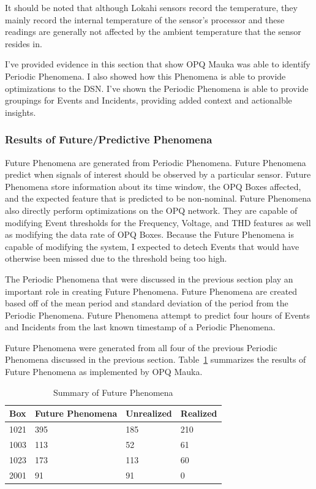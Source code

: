 It should be noted that although Lokahi sensors record the temperature, they mainly record the internal temperature of the sensor's processor and these readings are generally not affected by the ambient temperature that the sensor resides in.

I've provided evidence in this section that show OPQ Mauka was able to identify Periodic Phenomena. I also showed how this Phenomena is able to provide optimizations to the DSN. I've shown the Periodic Phenomena is able to provide groupings for Events and Incidents, providing added context and actionalble insights.

\subsubsection{Results of Future/Predictive Phenomena}

Future Phenomena are generated from Periodic Phenomena. Future Phenomena predict when signals of interest should be observed by a particular sensor. Future Phenomena store information about its time window, the OPQ Boxes affected, and the expected feature that is predicted to be non-nominal. Future Phenomena also directly perform optimizations on the OPQ network. They are capable of modifying Event thresholds for the Frequency, Voltage, and THD features as well as modifying the data rate of OPQ Boxes. Because the Future Phenomena is capable of modifying the system, I expected to detech Events that would have otherwise been missed due to the threshold being too high.

The Periodic Phenomena that were discussed in the previous section play an important role in creating Future Phenomena. Future Phenomena are created based off of the mean period and standard deviation of the period from the Periodic Phenomena. Future Phenomena attempt to predict four hours of Events and Incidents from the last known timestamp of a Periodic Phenomena.

Future Phenomena were generated from all four of the previous Periodic Phenomena discussed in the previous section. Table~\ref{table:future_summary} summarizes the results of Future Phenomena as implemented by OPQ Mauka.

\begin{table}[H]
    \centering
    \caption{Summary of Future Phenomena}
    \begin{tabularx}{\textwidth}{llll}
        \toprule
        \textbf{Box} & \textbf{Future Phenomena} &\textbf{Unrealized} & \textbf{Realized} \\
        \midrule
        1021 & 395 & 185 & 210 \\
        1003 & 113 & 52 & 61 \\
        1023 & 173 & 113 & 60 \\
        2001 & 91 & 91 & 0 \\
        \bottomrule
    \end{tabularx}
    \label{table:future_summary}
\end{table}

